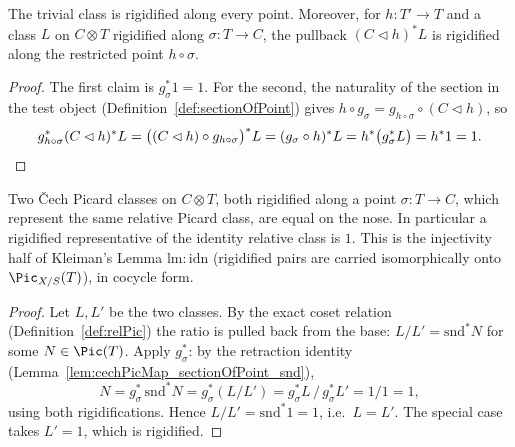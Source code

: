 \begin{lemma}
  \label{lem:isRigidified_cechPicMap}
  \leanok
  The trivial class is rigidified along every point. Moreover, for \(h \colon T' \to T\) and a
  class \(L\) on \(C \otimes T\) rigidified along \(\sigma \colon T \to C\), the pullback
  \((C \lhd h)^{*} L\) is rigidified along the restricted point \(h \circ \sigma\).
\end{lemma}
\begin{proof}
  \leanok
  The first claim is \(g_\sigma^{*} 1 = 1\). For the second, the naturality of the section in
  the test object (Definition~\ref{def:sectionOfPoint}) gives \(h \circ g_\sigma =
  g_{h \circ \sigma} \circ (C \lhd h)\), so
  \[
    g_{h \circ \sigma}^{*} (C \lhd h)^{*} L
      = \bigl((C \lhd h) \circ g_{h \circ \sigma}\bigr)^{*} L
      = (g_\sigma \circ h)^{*} L
      = h^{*} \bigl(g_\sigma^{*} L\bigr) = h^{*} 1 = 1 . \qedhere
  \]
\end{proof}

\begin{theorem}
  \label{thm:isRigidified_eq_of_relPicMk_eq}
  \leanok
  Two \v Cech Picard classes on \(C \otimes T\), both rigidified along a point
  \(\sigma \colon T \to C\), which represent the same relative Picard class, are equal on the
  nose. In particular a rigidified representative of the identity relative class is \(1\).
  This is the injectivity half of Kleiman's Lemma \(\mathrm{lm{:}idn}\) (rigidified pairs are
  carried isomorphically onto \(\Pic_{X/S}(T)\)), in cocycle form.
\end{theorem}
\begin{proof}
  \leanok
  Let \(L, L'\) be the two classes. By the exact coset relation
  (Definition~\ref{def:relPic}) the ratio is pulled back from the base: \(L/L' =
  \mathrm{snd}^{*} N\) for some \(N \in \Pic(T)\). Apply \(g_\sigma^{*}\): by the retraction
  identity (Lemma~\ref{lem:cechPicMap_sectionOfPoint_snd}),
  \[
    N = g_\sigma^{*}\,\mathrm{snd}^{*} N = g_\sigma^{*}(L/L')
      = g_\sigma^{*}L \,/\, g_\sigma^{*}L' = 1/1 = 1 ,
  \]
  using both rigidifications. Hence \(L/L' = \mathrm{snd}^{*}1 = 1\), i.e.\ \(L = L'\). The
  special case takes \(L' = 1\), which is rigidified.
\end{proof}


